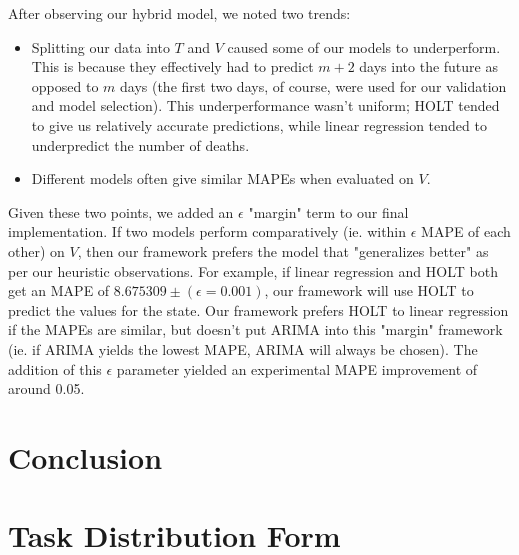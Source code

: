 \documentclass[sigconf,nonacm]{acmart}
\begin{document}
After observing our hybrid model, we noted two trends: 
\begin{itemize}
\item 
Splitting our data into $T$ and $V$ caused some of our models to
underperform. This is because they effectively had to predict $m+2$ days into
the future as opposed to $m$ days (the first two days, of course, were used for
our validation and model selection). This underperformance wasn't uniform;
HOLT tended to give us relatively accurate predictions, while linear regression
tended to underpredict the number of deaths. 
\item
Different models often give similar MAPEs when evaluated on $V$. 
\end{itemize}

Given these two points, we added an $\epsilon$ "margin" term to our final
implementation. If two models perform comparatively (ie. within $\epsilon$ MAPE
of each other) on $V$, then our framework prefers the model that "generalizes
better" as per our heuristic observations. For example, if linear regression
and HOLT both get an MAPE of $8.675309 \pm (\epsilon = 0.001)$, our framework
will use HOLT to predict the values for the state. Our framework prefers HOLT
to linear regression if the MAPEs are similar, but doesn't put ARIMA into this
"margin" framework (ie. if ARIMA yields the lowest MAPE, ARIMA will always be
chosen). The addition of this $\epsilon$ parameter yielded an experimental 
MAPE improvement of around 0.05. 

\section{Conclusion}

\section{Task Distribution Form}
\end{document}
